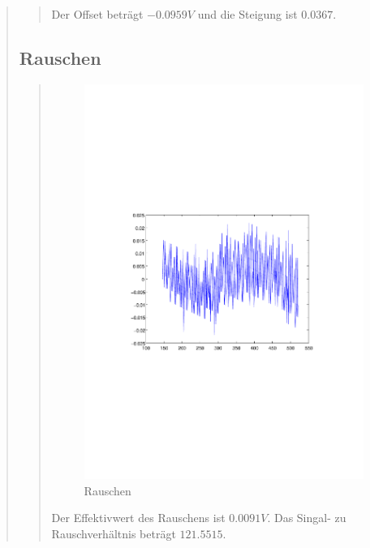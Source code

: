 \begin{quote}
\begin{quote}
        Der Offset beträgt $-0.0959 V$ und die Steigung ist $0.0367$.
        
        
    \end{quote}


    \subsection{Rauschen}
    \begin{quote}
        
        \begin{figure}[H]
        \centering
            \includegraphics[scale=0.7, trim = 30mm 90mm 30mm 90mm, clip]{Bilder/Rauschen}
                \caption{Rauschen}
                \label{fig:Rauschen}
        \end{figure}
        
        Der Effektivwert des Rauschens ist $ 0.0091 V$. Das Singal- zu Rauschverhältnis beträgt $121.5515$.
        

\end{quote}
\end{quote}
